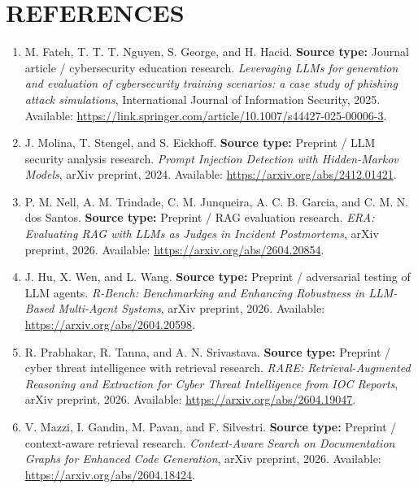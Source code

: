 \chapter*{REFERENCES}

\begin{enumerate}

\item
M. Fateh, T. T. T. Nguyen, S. George, and H. Hacid.
\textbf{Source type:} Journal article / cybersecurity education research.
\textit{Leveraging LLMs for generation and evaluation of cybersecurity training scenarios: a case study of phishing attack simulations},
International Journal of Information Security, 2025.
Available: \url{https://link.springer.com/article/10.1007/s44427-025-00006-3}.

\item
J. Molina, T. Stengel, and S. Eickhoff.
\textbf{Source type:} Preprint / LLM security analysis research.
\textit{Prompt Injection Detection with Hidden-Markov Models},
arXiv preprint, 2024.
Available: \url{https://arxiv.org/abs/2412.01421}.

\item
P. M. Nell, A. M. Trindade, C. M. Junqueira, A. C. B. Garcia, and C. M. N. dos Santos.
\textbf{Source type:} Preprint / RAG evaluation research.
\textit{ERA: Evaluating RAG with LLMs as Judges in Incident Postmortems},
arXiv preprint, 2026.
Available: \url{https://arxiv.org/abs/2604.20854}.

\item
J. Hu, X. Wen, and L. Wang.
\textbf{Source type:} Preprint / adversarial testing of LLM agents.
\textit{R-Bench: Benchmarking and Enhancing Robustness in LLM-Based Multi-Agent Systems},
arXiv preprint, 2026.
Available: \url{https://arxiv.org/abs/2604.20598}.

\item
R. Prabhakar, R. Tanna, and A. N. Srivastava.
\textbf{Source type:} Preprint / cyber threat intelligence with retrieval research.
\textit{RARE: Retrieval-Augmented Reasoning and Extraction for Cyber Threat Intelligence from IOC Reports},
arXiv preprint, 2026.
Available: \url{https://arxiv.org/abs/2604.19047}.

\item
V. Mazzi, I. Gandin, M. Pavan, and F. Silvestri.
\textbf{Source type:} Preprint / context-aware retrieval research.
\textit{Context-Aware Search on Documentation Graphs for Enhanced Code Generation},
arXiv preprint, 2026.
Available: \url{https://arxiv.org/abs/2604.18424}.


\end{enumerate}
